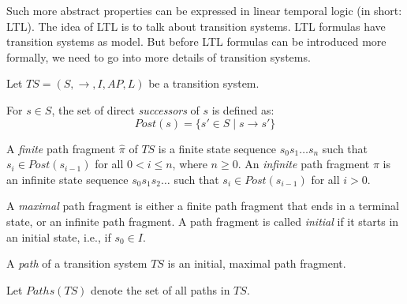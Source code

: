 \documentclass{securem}
\begin{document}
Such more abstract properties can be expressed in linear temporal logic (in short: LTL).
The idea of LTL is to talk about transition systems.
LTL formulas have transition systems as model.
But before LTL formulas can be introduced more formally, we need to go into more details of transition systems.

Let $ TS = (S, \rightarrow, I, AP, L) $ be a transition system.

\begin{definition}
    For $ s \in S $, the set of direct \textit{successors} of $ s $ is defined as:
    \begin{equation}
        Post(s) = \{ s' \in S \mid s \rightarrow s' \}
    \end{equation}
\end{definition}

\begin{definition}
    A \textit{finite} path fragment $ \widehat{\pi} $ of $ TS $ is a finite state sequence $ s_0 s_1 \dots s_n $ such that $ s_i \in Post(s_{i - 1}) $ for all $ 0 < i \leq n $, where $ n \geq 0 $.
    An \textit{infinite} path fragment $ \pi $ is an infinite state sequence $ s_0 s_1 s_2 \dots $ such that $ s_i \in Post(s_{i - 1}) $ for all $ i > 0 $.
\end{definition}

\begin{definition}
    A \textit{maximal} path fragment is either a finite path fragment that ends in a terminal state, or an infinite path fragment.
    A path fragment is called \textit{initial} if it starts in an initial state, i.e., if $ s_0 \in I $.
\end{definition}

\begin{definition}
    A \textit{path} of a transition system $ TS $ is an initial, maximal path fragment.

    Let $ Paths(TS) $ denote the set of all paths in $ TS $.
\end{definition}
\end{document}
